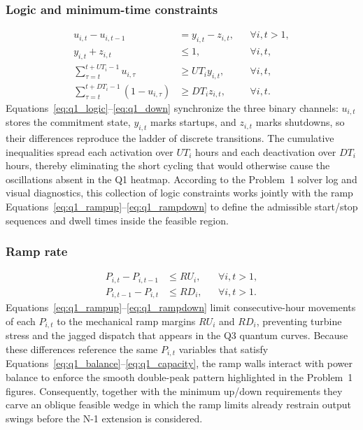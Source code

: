 \documentclass{apmcmthesis}
\begin{document}
\subsubsection{Logic and minimum-time constraints}
\begin{align}
    u_{i,t} - u_{i,t-1} &= y_{i,t} - z_{i,t}, && \forall i,t>1, \label{eq:q1_logic} \\
    y_{i,t} + z_{i,t} &\le 1, && \forall i,t, \label{eq:q1_mutual} \\
    \sum_{\tau=t}^{t+UT_i-1} u_{i,\tau} &\ge UT_i y_{i,t}, && \forall i,t, \label{eq:q1_up} \\
    \sum_{\tau=t}^{t+DT_i-1} (1-u_{i,\tau}) &\ge DT_i z_{i,t}, && \forall i,t. \label{eq:q1_down}
\end{align}
\noindent Equations~\eqref{eq:q1_logic}--\eqref{eq:q1_down} synchronize the three binary channels: $u_{i,t}$ stores the commitment state, $y_{i,t}$ marks startups, and $z_{i,t}$ marks shutdowns, so their differences reproduce the ladder of discrete transitions.
The cumulative inequalities spread each activation over $UT_i$ hours and each deactivation over $DT_i$ hours, thereby eliminating the short cycling that would otherwise cause the oscillations absent in the Q1 heatmap.
According to the Problem~1 solver log and visual diagnostics, this collection of logic constraints works jointly with the ramp Equations~\eqref{eq:q1_rampup}--\eqref{eq:q1_rampdown} to define the admissible start/stop sequences and dwell times inside the feasible region.

\subsubsection{Ramp rate}
\begin{align}
    P_{i,t} - P_{i,t-1} &\le RU_i, && \forall i,t>1, \label{eq:q1_rampup} \\
    P_{i,t-1} - P_{i,t} &\le RD_i, && \forall i,t>1. \label{eq:q1_rampdown}
\end{align}
\noindent Equations~\eqref{eq:q1_rampup}--\eqref{eq:q1_rampdown} limit consecutive-hour movements of each $P_{i,t}$ to the mechanical ramp margins $RU_i$ and $RD_i$, preventing turbine stress and the jagged dispatch that appears in the Q3 quantum curves.
Because these differences reference the same $P_{i,t}$ variables that satisfy Equations~\eqref{eq:q1_balance}--\eqref{eq:q1_capacity}, the ramp walls interact with power balance to enforce the smooth double-peak pattern highlighted in the Problem~1 figures.
Consequently, together with the minimum up/down requirements they carve an oblique feasible wedge in which the ramp limits already restrain output swings before the N-1 extension is considered.
\end{document}
